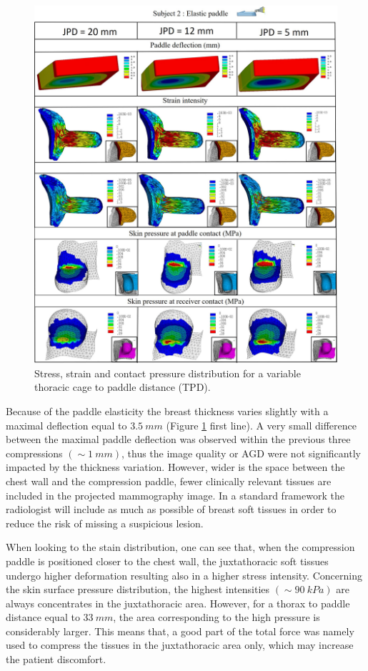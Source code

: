 \begin{figure}[!h]
\centering
\includegraphics[width=1\textwidth,keepaspectratio]{figures/elasticpaddleresults.jpg} 
\caption{Stress, strain and contact pressure distribution for a variable thoracic cage to paddle distance (TPD).}\label{fig:elasticpaddle}
\end{figure}


Because of the paddle elasticity the breast thickness varies slightly with a maximal deflection equal to $3.5\ mm$ (Figure \ref{fig:elasticpaddle} first line). A very small difference between the maximal paddle deflection was observed within the previous three compressions   $(\sim 1\ mm)$, thus the image quality or AGD were not significantly impacted by the thickness variation. However, wider is the space between the chest wall and the compression paddle, fewer clinically relevant tissues are included in the projected mammography image. In a standard framework the radiologist will include as much as possible of breast soft tissues in order to reduce the risk of missing a suspicious lesion.

When looking to the stain distribution, one can see that, when the compression paddle is positioned closer to the chest wall, the juxtathoracic soft tissues undergo higher deformation resulting also in a higher stress intensity. Concerning the skin surface pressure distribution, the highest intensities $ (\sim 90\ kPa)$ are always concentrates in the juxtathoracic area. However, for a thorax to paddle distance equal to $33\ mm$, the area corresponding to the high pressure is considerably larger. This means that, a good part of the total force was  namely used to compress the tissues in the juxtathoracic area only, which may increase the patient discomfort.


